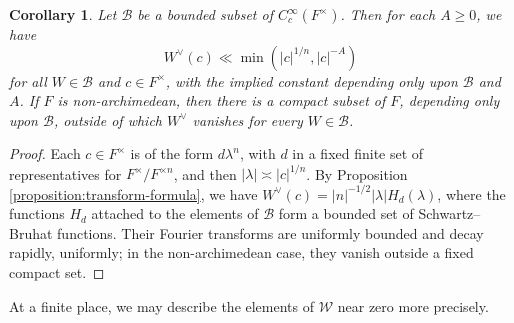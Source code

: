 \documentclass[reqno]{amsart}
\theoremstyle{plain}
\newtheorem{corollary}[theorem]{Corollary}
\theoremstyle{definition}
\theoremstyle{itplain}
\numberwithin{equation}{section}
\numberwithin{theorem}{section}
\begin{document}
\begin{corollary}\label{corollary:decay}
  Let $\mathcal{B}$ be a bounded subset of $C_c^\infty(F^\times)$.  Then for each $A \geq 0$, we have
  \begin{equation*}
    W^\vee(c) \ll \min \left( \lvert c \rvert^{1/n}, \lvert c \rvert^{-A} \right)
  \end{equation*}
  for all $W \in \mathcal{B}$ and $c \in F^\times$, with the implied constant depending only upon $\mathcal{B}$ and $A$.  If $F$ is non-archimedean, then there is a compact subset of $F$, depending only upon $\mathcal{B}$, outside of which $W^\vee$ vanishes for every $W \in \mathcal{B}$.
\end{corollary}
\begin{proof}
  Each $c \in F^\times$ is of the form $d \lambda^n$, with $d$ in a fixed finite set of representatives for $F^\times / F^{\times n}$, and then $\lvert \lambda \rvert \asymp \lvert c \rvert^{1/n}$.  By Proposition \ref{proposition:transform-formula}, we have $W^\vee(c) = \lvert n \rvert^{-1/2} \lvert \lambda \rvert \hat{H}_d(\lambda)$, where the functions $H_d$ attached to the elements of $\mathcal{B}$ form a bounded set of Schwartz--Bruhat functions.  Their Fourier transforms are uniformly bounded and decay rapidly, uniformly; in the non-archimedean case, they vanish outside a fixed compact set.
\end{proof}

At a finite place, we may describe the elements of $\mathcal{W}$ near zero more precisely.
\end{document}
